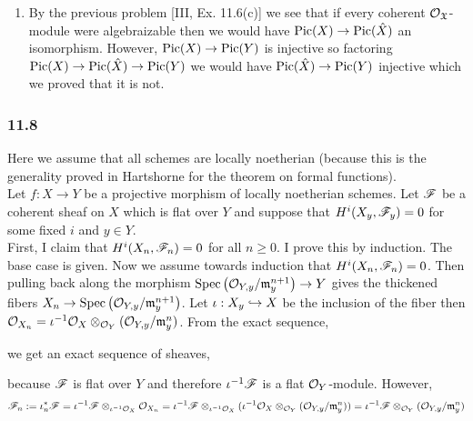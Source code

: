 \documentclass[12pt]{article}
\begin{document}
\begin{enumerate}
\item By the previous problem [III, Ex. 11.6(c)] we see that if every coherent $\mathcal{O}_{\mathfrak{X}}$-module were algebraizable then we would have $\mathrm{Pic}(X) \to \mathrm{Pic}(\hat{X})$ an isomorphism. However, $\mathrm{Pic}(X) \to \mathrm{Pic}(Y)$ is injective so factoring $\mathrm{Pic}(X) \to \mathrm{Pic}(\hat{X}) \to \mathrm{Pic}(Y)$ we would have $\mathrm{Pic}(\hat{X}) \to \mathrm{Pic}(Y)$ injective which we proved that it is not.  
\end{enumerate}

\subsubsection{11.8}

Here we assume that all schemes are locally noetherian (because this is the generality proved in Hartshorne for the theorem on formal functions).
\bigskip\\
Let $f : X \to Y$ be a projective morphism of locally noetherian schemes. Let $\mathscr{F}$ be a coherent sheaf on $X$ which is flat over $Y$ and suppose that $H^i(X_y, \mathscr{F}_y) = 0$ for some fixed $i$ and $y \in Y$.
\bigskip\\
First, I claim that $H^i(X_n, \mathscr{F}_n) = 0$ for all $n \ge 0$. I prove this by induction. The base case is given. Now we assume towards induction that $H^i(X_n, \mathscr{F}_n) = 0$. Then pulling back along the morphism $\mathrm{Spec}\left( \mathcal{O}_{Y, y} / \mathfrak{m}_y^{n+1} \right) \to Y$ gives the thickened fibers $X_n \to \mathrm{Spec}\left( \mathcal{O}_{Y, y} / \mathfrak{m}_y^{n+1} \right)$. Let $\iota : X_y \hookrightarrow X$ be the inclusion of the fiber then $\mathcal{O}_{X_n} = \iota^{-1} \mathcal{O}_{X} \otimes_{\mathcal{O}_{Y}} (\mathcal{O}_{Y, y} / \mathfrak{m}_y^n)$.
From the exact sequence,
\begin{center}
\end{center}
we get an exact sequence of sheaves,
\begin{center}
\end{center}
because $\mathscr{F}$ is flat over $Y$ and therefore $\iota^{-1} \mathscr{F}$ is a flat $\mathcal{O}_{Y}$-module. However, 
\[ \mathscr{F}_n := \iota_n^* \mathscr{F} = \iota^{-1} \mathscr{F} \otimes_{\iota^{-1} \mathcal{O}_{X}} \mathcal{O}_{X_n} = \iota^{-1} \mathscr{F} \otimes_{\iota^{-1} \mathcal{O}_{X}} (\iota^{-1} \mathcal{O}_{X} \otimes_{\mathcal{O}_{Y}} (\mathcal{O}_{Y, y} / \mathfrak{m}_y^n)) = \iota^{-1} \mathscr{F} \otimes_{\mathcal{O}_{Y}} (\mathcal{O}_{Y, y} / \mathfrak{m}_y^n) \]
\end{document}
